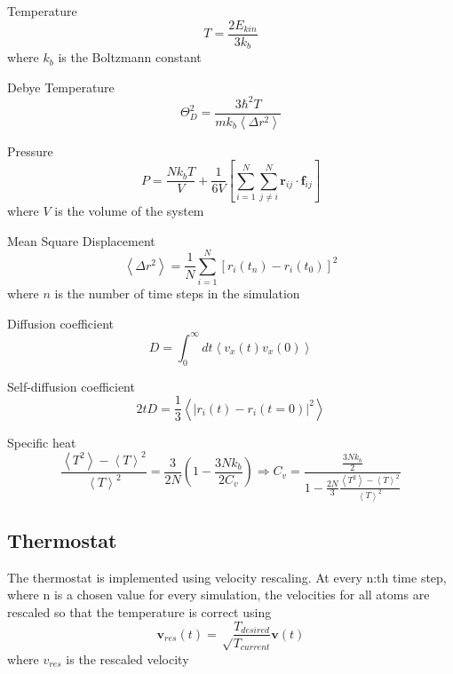 \documentclass[12pt,a4paper]{article}
\begin{document}
Temperature
\begin{equation}
\label{eq:temperature}
T=\frac{2E_{kin}}{3k_b}
\end{equation}
where \(k_b\) is the Boltzmann constant

Debye Temperature
\begin{equation}
\label{eq:debyetemperature}
\Theta_D^2=\frac{3 \hbar^2T}{mk_b \left< \Delta r^2\right>}
\end{equation}

Pressure
\begin{equation}
\label{eq:pressure}
P=\frac{Nk_bT}{V} + \frac 1 {6V} \left[\sum_{i=1}^N \sum_{j\not=i}^N  \mathbf r_{ij} \cdot \mathbf f_{ij} \right]
\end{equation}
where \(V\) is the volume of the system

Mean Square Displacement
\begin{equation}
\label{eq:MSD}
\left< \Delta r^2 \right>= \frac 1 N \sum_{i=1}^N \left[ r_i(t_n)-r_i(t_0) \right]^2
\end{equation}
where \( n\) is the number of time steps in the simulation

Diffusion coefficient
\begin{equation}
\label{eq:diffCoeff}
D= \int_0^\infty dt \left< v_x(t)v_x(0)\right>
\end{equation}

Self-diffusion coefficient
\begin{equation}
\label{eq:selfDiffCoeff}
2tD=\frac 1 3 \left<|r_i(t)-r_i(t=0)|^2 \right>
\end{equation}

Specific heat
\begin{equation}
\label{eq:specHeat}
\frac{\left< T^2\right> - \left< T \right>^2}{\left< T\right>^2} = \frac 3{2N} \left(1-\frac{3Nk_b}{2C_v} \right) \Rightarrow
C_v =\frac{\frac{3Nk_b} 2}{1-\frac{2N} 3 \frac{\left< T^2\right> - \left< T \right>^2}{\left< T\right>^2}}
\end{equation}

\subsection{Thermostat}
\label{sec:thermostat}

The thermostat is implemented using velocity rescaling.
At every n:th time step, where n is a chosen value for every simulation, the velocities for all atoms are rescaled so that the temperature is correct using
\begin{equation}
\mathbf v_{res}(t)=\sqrt \frac {T_{desired}} {T_{current}} \mathbf v(t)
\end{equation}
where \( v_{res}\) is the rescaled velocity
\end{document}
